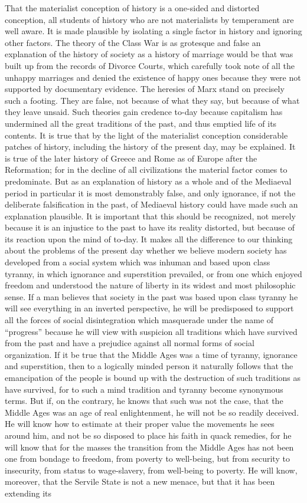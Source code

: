 \documentclass{book}
\begin{document}
That the materialist conception of history is a one-sided and distorted conception, all students of history who are not materialists by temperament are well aware. It is made plausible by isolating a single factor in history and ignoring other factors. The theory of the Class War is as grotesque and false an explanation of the history of society as a history of marriage would be that was built up from the records of Divorce Courts, which carefully took note of all the unhappy marriages and denied the existence of happy ones because they were not supported by documentary evidence. The heresies of Marx stand on precisely such a footing. They are false, not because of what they say, but because of what they leave unsaid. Such theories gain credence to-day because capitalism has undermined all the great traditions of the past, and thus emptied life of its contents. It is true that by the light of the materialist conception considerable patches of history, including the history of the present day, may be explained. It is true of the later history of Greece and Rome as of Europe after the Reformation; for in the decline of all civilizations the material factor comes to predominate. But as an explanation of history as a whole and of the Mediaeval period in particular it is most demonstrably false, and only ignorance, if not the deliberate falsification in the past, of Mediaeval history could have made such an explanation plausible. It is important that this should be recognized, not merely because it is an injustice to the past to have its reality distorted, but because of its reaction upon the mind of to-day. It makes all the difference to our thinking about the problems of the present day whether we believe modern society has developed from a social system which was inhuman and based upon class tyranny, in which ignorance and superstition prevailed, or from one which enjoyed freedom and understood the nature of liberty in its widest and most philosophic sense. If a man believes that society in the past was based upon class tyranny he will see everything in an inverted perspective, he will be predisposed to support all the forces of social disintegration which masquerade under the name of “progress” because he will view with suspicion all traditions which have survived from the past and have a prejudice against all normal forms of social organization. If it be true that the Middle Ages was a time of tyranny, ignorance and superstition, then to a logically minded person it naturally follows that the emancipation of the people is bound up with the destruction of such traditions as have survived, for to such a mind tradition and tyranny become synonymous terms. But if, on the contrary, he knows that such was not the case, that the Middle Ages was an age of real enlightenment, he will not be so readily deceived. He will know how to estimate at their proper value the movements he sees around him, and not be so disposed to place his faith in quack remedies, for he will know that for the masses the transition from the Middle Ages has not been one from bondage to freedom, from poverty to well-being, but from security to insecurity, from status to wage-slavery, from well-being to poverty. He will know, moreover, that the Servile State is not a new menace, but that it has been extending its 
\end{document}
